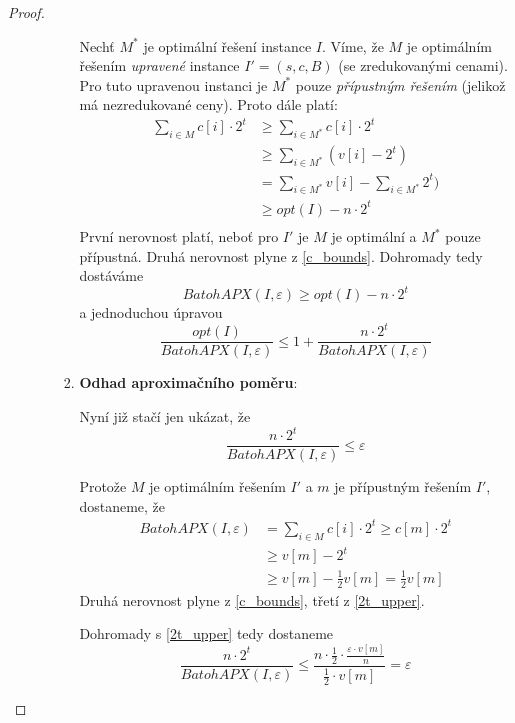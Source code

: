 \documentclass[11pt]{report} %
\numberwithin{equation}{section}
\begin{document}
\begin{proof}
\begin{enumerate}
\begin{enumerate}
\begin{enumerate}
		Nechť $M^*$ je optimální řešení instance $I$. Víme, že $M$ je optimálním řešením \textit{upravené} instance $I' = (s, c, B)$ (se zredukovanými cenami). Pro tuto upravenou instanci je $M^*$ pouze \textit{přípustným řešením} (jelikož má nezredukované ceny). Proto dále platí:
		\begin{align*}
			\sum\limits_{i\in M} c[i] \cdot 2^t &\geq \sum\limits_{i\in M^*} c[i] \cdot 2^t \\
												&\geq \sum\limits_{i\in M^*} (v[i] - 2^t) \\
												&= \sum\limits_{i\in M^*} v[i] - \sum\limits_{i\in M^*} 2^t) \\
												&\geq opt(I) - n\cdot 2^t\\
		\end{align*}
		První nerovnost platí, neboť pro $I'$ je $M$ je optimální a $M^*$ pouze přípustná. Druhá nerovnost plyne z \ref{c_bounds}. 
		\medskip
		Dohromady tedy dostáváme
		\begin{equation*}
			BatohAPX(I, \varepsilon) \geq opt(I) - n\cdot 2^t
		\end{equation*}
		a jednoduchou úpravou
		\begin{equation*}
		\frac{opt(I)}{BatohAPX(I, \varepsilon)} \leq 1 + \frac{n\cdot 2^t}{BatohAPX(I, \varepsilon)}
		\end{equation*}
		
		\item \textbf{Odhad aproximačního poměru}:
		
		Nyní již stačí jen ukázat, že
		\begin{equation*}
			\frac{n\cdot 2^t}{BatohAPX(I, \varepsilon)} \leq \varepsilon
		\end{equation*}
		
		Protože $M$ je optimálním řešením $I'$ a ${m}$ je přípustným řešením $I'$, dostaneme, že
		\begin{align*}
			BatohAPX(I, \varepsilon) 	&= \sum\limits_{i \in M} c[i]\cdot 2^t \geq c[m] \cdot 2^t\\
										&\geq v[m] - 2^t\\
										&\geq v[m] - \frac{1}{2}v[m] = \frac{1}{2}v[m]
		\end{align*}
		Druhá nerovnost plyne z \ref{c_bounds}, třetí z \ref{2t_upper}.
		
		Dohromady s \ref{2t_upper} tedy dostaneme
		\begin{equation*}
		\frac{n\cdot 2^t}{BatohAPX(I, \varepsilon)} \leq \frac{n \cdot \frac{1}{2} \cdot \frac{\varepsilon\cdot v[m]}{n}}{\frac{1}{2} \cdot v[m]} = \varepsilon
		\end{equation*}
	\end{enumerate}


\end{enumerate}
\end{enumerate}
\end{proof}
\end{document}
